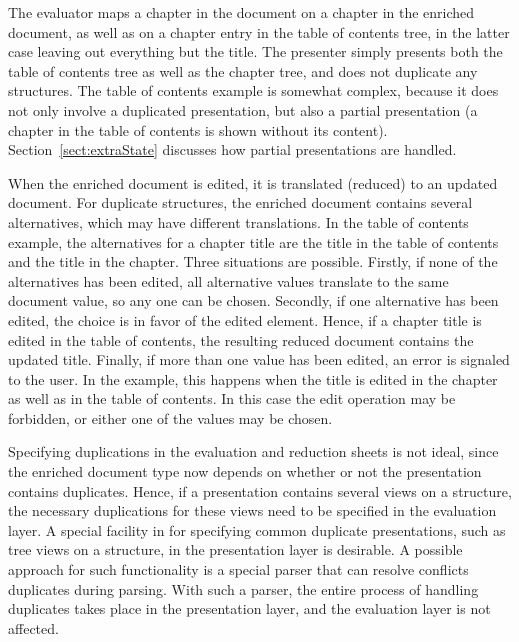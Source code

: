 The evaluator maps a chapter in the document on a chapter in the enriched document, as well as on a chapter entry in the table of contents tree, in the latter case leaving out everything but the title. The presenter simply presents both the table of contents tree as well as the chapter tree, and does not duplicate any structures. The table of contents example is somewhat complex, because it does not only involve a duplicated presentation, but also a partial presentation (a chapter in the table of contents is shown without its content). Section~\ref{sect:extraState} discusses how partial presentations are handled.

When the enriched document is edited, it is translated (reduced) to an updated document. For duplicate structures, the enriched document contains several alternatives, which may have different translations. In the table of contents example, the alternatives for a chapter title are the title in the table of contents and the title in the chapter. Three situations are possible. Firstly, if none of the alternatives has been edited, all alternative values translate to the same document value, so any one can be chosen. Secondly, if one alternative has been edited, the choice is in favor of the edited element. Hence, if a chapter title is edited in the table of contents, the resulting reduced document contains the updated title. Finally, if more than one value has been edited, an error is signaled to the user. In the example, this happens when the title is edited in the chapter as well as in the table of contents. In this case the edit operation may be forbidden, or either one of the values may be chosen.  

Specifying duplications in the evaluation and reduction sheets is not ideal, since the enriched document type now depends on whether or not the presentation contains duplicates. Hence, if a presentation contains several views on a structure, the necessary duplications for these views need to be specified in the evaluation layer. A special facility in for specifying common duplicate presentations, such as tree views on a structure, in the presentation layer is desirable. A possible approach for such functionality is a special parser that can resolve conflicts duplicates during parsing. With such a parser, the entire process of handling duplicates takes place in the presentation layer, and the evaluation layer is not affected. 

